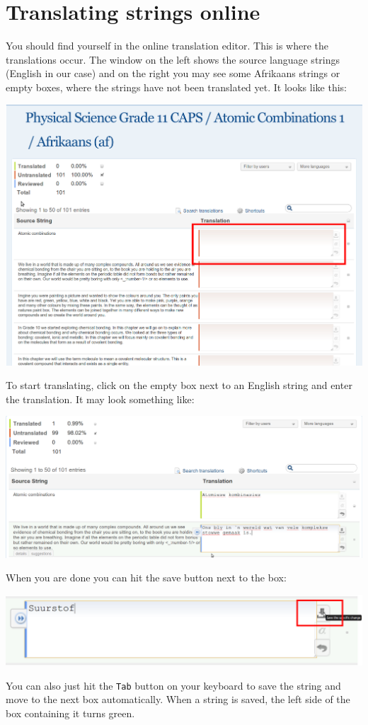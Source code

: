 \documentclass[12pt, a4paper]{article}
\begin{document}
\section{Translating strings online}
You should find yourself in the online translation editor. This is where the translations occur. The window on the left shows the source language strings (English in our case) and on the right you may see some Afrikaans strings or empty boxes, where the strings have not been translated yet. It looks like this:
\begin{center}
    \centerline{\includegraphics[width=0.8\paperwidth]{images/translatestrings.png}}
\end{center}


To start translating, click on the empty box next to an English string and enter the translation. It may look something like:
\begin{center}
    \centerline{\includegraphics[width=0.8\paperwidth]{images/translating.png}}
\end{center}

When you are done you can hit the save button next to the box:
\begin{center}
    \centerline{\includegraphics[width=0.8\paperwidth]{images/saving.png}}
\end{center}
You can also just hit the \texttt{Tab} button on your keyboard to save the string and move to the next box automatically. When a string is saved, the left side of the box containing it turns green.
\end{document}
